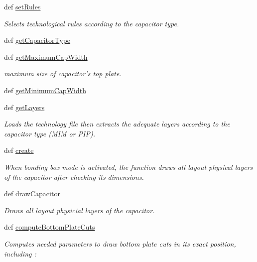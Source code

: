 \begin{DoxyCompactItemize}
def \hyperlink{classpython_1_1CapacitorUnit_1_1CapacitorUnit_a3b578035b1559391931dade7c2508105}{set\-Rules}
\begin{DoxyCompactList}\small\item\em Selects technological rules according to the capacitor type. \end{DoxyCompactList}\item 
def \hyperlink{classpython_1_1CapacitorUnit_1_1CapacitorUnit_a127dcda66d458f9320e541649101607e}{get\-Capacitor\-Type}
\item 
def \hyperlink{classpython_1_1CapacitorUnit_1_1CapacitorUnit_a7afefaf3a15d637ffe979bc54d57c6c2}{get\-Maximum\-Cap\-Width}
\begin{DoxyCompactList}\small\item\em maximum size of capacitor's top plate. \end{DoxyCompactList}\item 
def \hyperlink{classpython_1_1CapacitorUnit_1_1CapacitorUnit_aacb6369181aa03823cb1ce42adb0ee25}{get\-Minimum\-Cap\-Width}
\item 
def \hyperlink{classpython_1_1CapacitorUnit_1_1CapacitorUnit_a7be694eb909dc1e49326e3b5dd1e6887}{get\-Layers}
\begin{DoxyCompactList}\small\item\em Loads the technology file then extracts the adequate layers according to the capacitor type (M\-I\-M or P\-I\-P). \end{DoxyCompactList}\item 
def \hyperlink{classpython_1_1CapacitorUnit_1_1CapacitorUnit_a5b7ef0221e471e99fa7f0a87a28ba1ea}{create}
\begin{DoxyCompactList}\small\item\em When bonding box mode is activated, the function draws all layout physical layers of the capacitor after checking its dimensions. \end{DoxyCompactList}\item 
def \hyperlink{classpython_1_1CapacitorUnit_1_1CapacitorUnit_ae2ec4683c7f6c30fbb1687934673410c}{draw\-Capacitor}
\begin{DoxyCompactList}\small\item\em Draws all layout physicial layers of the capacitor. \end{DoxyCompactList}\item 
def \hyperlink{classpython_1_1CapacitorUnit_1_1CapacitorUnit_a8f71111f71d084f05742fadf134cb87e}{compute\-Bottom\-Plate\-Cuts}
\begin{DoxyCompactList}\small\item\em Computes needed parameters to draw bottom plate cuts in its exact position, including \-: \end{DoxyCompactList}\item 

\end{DoxyCompactItemize}
